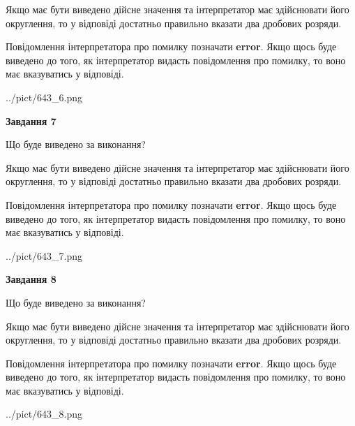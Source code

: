 \documentclass[12pt, ukrainian]{article}
\begin{document}
{\begin {Large}
Якщо має бути виведено дійсне значення та інтерпретатор має здійснювати його округлення, 
то у відповіді достатньо правильно вказати два дробових розряди.

Повідомлення інтерпретатора про помилку позначати \textbf{error}.
Якщо щось буде виведено до того, як інтерпретатор видасть повідомлення про помилку, 
то воно має вказуватись у відповіді. \par

\begin{center}
	{../pict/643_6.png}
\end{center}
\newpage

{\begin {center}\textbf{Завдання 7}\end {center}}\par
Що буде виведено за виконання? \par

Якщо має бути виведено дійсне значення та інтерпретатор має здійснювати його округлення, 
то у відповіді достатньо правильно вказати два дробових розряди.

Повідомлення інтерпретатора про помилку позначати \textbf{error}.
Якщо щось буде виведено до того, як інтерпретатор видасть повідомлення про помилку, 
то воно має вказуватись у відповіді. \par

\begin{center}
	{../pict/643_7.png}
\end{center}
\newpage

{\begin {center}\textbf{Завдання 8}\end {center}}\par
Що буде виведено за виконання? \par

Якщо має бути виведено дійсне значення та інтерпретатор має здійснювати його округлення, 
то у відповіді достатньо правильно вказати два дробових розряди.

Повідомлення інтерпретатора про помилку позначати \textbf{error}.
Якщо щось буде виведено до того, як інтерпретатор видасть повідомлення про помилку, 
то воно має вказуватись у відповіді. \par

\begin{center}
	{../pict/643_8.png}
\end{center}
\newpage


\end{Large}}
\end{document}

